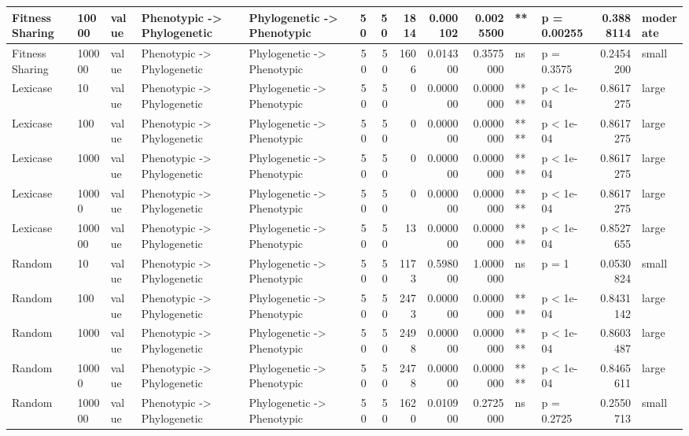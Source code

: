 \documentclass[]{book}
\begin{document}
\begin{table}
\begin{tabular}[t]{l|l|l|l|l|r|r|r|r|r|l|l|r|l}
\hline
Fitness Sharing & 10000 & value & Phenotypic
    ->
Phylogenetic & Phylogenetic
    ->
Phenotypic & 50 & 50 & 1814 & 0.000102 & 0.0025500 & ** & p = 0.00255 & 0.3888114 & moderate\\
\hline
Fitness Sharing & 100000 & value & Phenotypic
    ->
Phylogenetic & Phylogenetic
    ->
Phenotypic & 50 & 50 & 1606 & 0.014300 & 0.3575000 & ns & p = 0.3575 & 0.2454200 & small\\
\hline
Lexicase & 10 & value & Phenotypic
    ->
Phylogenetic & Phylogenetic
    ->
Phenotypic & 50 & 50 & 0 & 0.000000 & 0.0000000 & **** & p < 1e-04 & 0.8617275 & large\\
\hline
Lexicase & 100 & value & Phenotypic
    ->
Phylogenetic & Phylogenetic
    ->
Phenotypic & 50 & 50 & 0 & 0.000000 & 0.0000000 & **** & p < 1e-04 & 0.8617275 & large\\
\hline
Lexicase & 1000 & value & Phenotypic
    ->
Phylogenetic & Phylogenetic
    ->
Phenotypic & 50 & 50 & 0 & 0.000000 & 0.0000000 & **** & p < 1e-04 & 0.8617275 & large\\
\hline
Lexicase & 10000 & value & Phenotypic
    ->
Phylogenetic & Phylogenetic
    ->
Phenotypic & 50 & 50 & 0 & 0.000000 & 0.0000000 & **** & p < 1e-04 & 0.8617275 & large\\
\hline
Lexicase & 100000 & value & Phenotypic
    ->
Phylogenetic & Phylogenetic
    ->
Phenotypic & 50 & 50 & 13 & 0.000000 & 0.0000000 & **** & p < 1e-04 & 0.8527655 & large\\
\hline
Random & 10 & value & Phenotypic
    ->
Phylogenetic & Phylogenetic
    ->
Phenotypic & 50 & 50 & 1173 & 0.598000 & 1.0000000 & ns & p = 1 & 0.0530824 & small\\
\hline
Random & 100 & value & Phenotypic
    ->
Phylogenetic & Phylogenetic
    ->
Phenotypic & 50 & 50 & 2473 & 0.000000 & 0.0000000 & **** & p < 1e-04 & 0.8431142 & large\\
\hline
Random & 1000 & value & Phenotypic
    ->
Phylogenetic & Phylogenetic
    ->
Phenotypic & 50 & 50 & 2498 & 0.000000 & 0.0000000 & **** & p < 1e-04 & 0.8603487 & large\\
\hline
Random & 10000 & value & Phenotypic
    ->
Phylogenetic & Phylogenetic
    ->
Phenotypic & 50 & 50 & 2478 & 0.000000 & 0.0000000 & **** & p < 1e-04 & 0.8465611 & large\\
\hline
Random & 100000 & value & Phenotypic
    ->
Phylogenetic & Phylogenetic
    ->
Phenotypic & 50 & 50 & 1620 & 0.010900 & 0.2725000 & ns & p = 0.2725 & 0.2550713 & small\\

\end{tabular}
\end{table}
\end{document}
